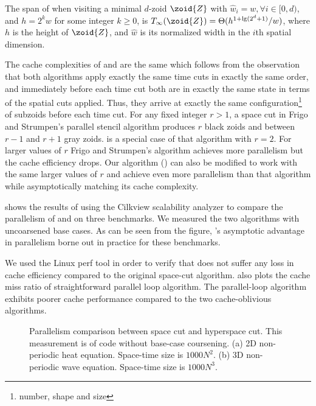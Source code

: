 \begin{corollary}
  The span of  when visiting a minimal $d$-zoid $\zoid{Z}$ with ${\widehat{w}}_i = w, \forall{i} \in [0, d)$, and
  $h = 2^k w$ for some integer $k \geq 0$, is $T_{\infty}(\zoid{Z}) =
  \Theta(h^{1 +\lg(2^d + 1)} / w )$, where $h$ is the height of
  $\zoid{Z}$, and ${\widehat{w}}$ is its normalized width in the $i$th
  spatial dimension.
\label{cor:SpaceCutSimpleCase}
\end{corollary}

The cache complexities of  and  are the same
which follows from the observation that both algorithms apply exactly
the same time cuts in exactly the same order, and immediately before
each time cut both are in exactly the same state in terms of the
spatial cuts applied.
%
Thus, they arrive at exactly the same configuration\footnote{number,
  shape and size} of subzoids before each time cut.  For any
fixed integer $r > 1$, a space cut in Frigo and Strumpen's parallel
stencil algorithm produces $r$ black zoids and between $r - 1$
and $r + 1$ gray zoids.  is a special case of that
algorithm with $r = 2$.  For larger values of $r$ Frigo and Strumpen's
algorithm achieves more parallelism but the cache efficiency
drops. Our algorithm () can also be modified to work with
the same larger values of $r$ and achieve even more parallelism than
that algorithm while asymptotically matching its cache complexity.

 shows the results of using the Cilkview
scalability analyzer \cite{YuxiongLe10} to compare the parallelism of
 and  on three benchmarks.  We measured the two
algorithms with uncoarsened base cases.  As can be seen from the
figure, 's asymptotic advantage in parallelism borne out in
practice for these benchmarks.

We used the Linux perf tool \cite{perf} in order to verify that
 does not suffer any loss in cache efficiency compared to
the original space-cut algorithm.  also plots
the cache miss ratio of straightforward parallel loop algorithm.  The
parallel-loop algorithm exhibits poorer cache performance compared to
the two cache-oblivious algorithms.

\begin{figure}
\centering

\subfigure[]{}
\label{fig:heat2DNPSpan}

\subfigure[]{}
\label{fig:dfdSpan}

\caption{Parallelism comparison between space cut and hyperspace cut.   This measurement is of code without base-case coursening.
 (a) 2D non-periodic heat equation. Space-time size is $1000N^2$.
 (b) 3D non-periodic wave equation. Space-time size is $1000N^3$.
}
\label{fig:Parallelism}
\end{figure}

